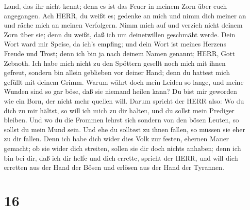 Land, das ihr nicht kennt; denn es ist das Feuer in meinem Zorn über
euch angegangen.  Ach HERR, du weißt es; gedenke an mich
und nimm dich meiner an und räche mich an meinen Verfolgern. Nimm mich
auf und verzieh nicht deinem Zorn über sie; denn du weißt, daß ich um
deinetwillen geschmäht werde.  Dein Wort ward mir Speise,
da ich's empfing; und dein Wort ist meines Herzens Freude und Trost;
denn ich bin ja nach deinem Namen genannt; HERR, Gott Zebaoth.
 Ich habe mich nicht zu den Spöttern gesellt noch mich mit
ihnen gefreut, sondern bin allein geblieben vor deiner Hand; denn du
hattest mich gefüllt mit deinem Grimm.  Warum währt doch
mein Leiden so lange, und meine Wunden sind so gar böse, daß sie niemand
heilen kann? Du bist mir geworden wie ein Born, der nicht mehr quellen
will.  Darum spricht der HERR also: Wo du dich zu mir
hältst, so will ich mich zu dir halten, und du sollst mein Prediger
bleiben. Und wo du die Frommen lehrst sich sondern von den bösen Leuten,
so sollst du mein Mund sein. Und ehe du solltest zu ihnen fallen, so
müssen sie eher zu dir fallen.  Denn ich habe dich wider
dies Volk zur festen, ehernen Mauer gemacht; ob sie wider dich streiten,
sollen sie dir doch nichts anhaben; denn ich bin bei dir, daß ich dir
helfe und dich errette, spricht der HERR,  und will dich
erretten aus der Hand der Bösen und erlösen aus der Hand der Tyrannen.

\hypertarget{section-15}{%
\section{16}\label{section-15}}

